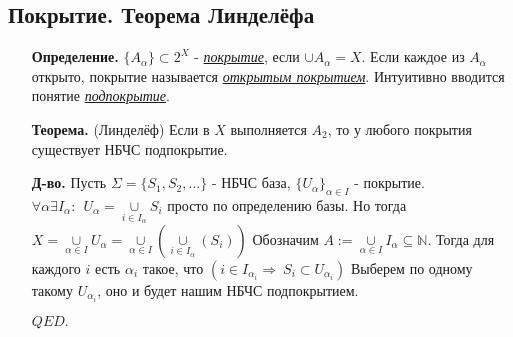 \documentclass[10pt]{report}
\begin{document}
\begin{spacing}{1.5}
\subsection{Покрытие. Теорема Линделёфа}
\begin{enumerate}
\item[\textbf{Определение.}] $\lbrace A_{\alpha}\rbrace\subset 2^{X}$ - \emph{\underline{покрытие}}, если $\cup A_{\alpha}=X$. Если каждое из $A_{\alpha}$ открыто, покрытие называется \emph{\underline{открытым покрытием}}. Интуитивно вводится понятие \emph{\underline{подпокрытие}}.
\item[\textbf{Теорема.}](Линделёф) Если в $X$ выполняется $A_{2}$, то у любого покрытия существует НБЧС подпокрытие.
\item[\textbf{Д-во.}] Пусть $\Sigma=\lbrace S_{1}, S_{2},...\rbrace$ - НБЧС база, $\lbrace U_{\alpha}\rbrace_{\alpha\in I}$ - покрытие.\\
$\forall \alpha \exists I_{\alpha}:~~U_{\alpha} = \underset{i\in I_{\alpha}}{\cup}S_{i}$ просто по определению базы. Но тогда\\
$X = \underset{\alpha\in I}{\cup}U_{\alpha} = \underset{\alpha\in I}{\cup}(\underset{i\in I_{\alpha}}{\cup}(S_{i}))$
Обозначим $A:=\underset{\alpha\in I}{\cup}I_{\alpha}\subseteq \mathbb{N}.$ Тогда для каждого $i$ есть $\alpha_{i}$ такое, что $(i\in I_{\alpha_{i}}\Longrightarrow~S_{i}\subset U_{\alpha_{i}})$ Выберем по одному такому $U_{\alpha_{i}}$, оно и будет нашим НБЧС подпокрытием.
\begin{flushright}
$QED.$
\end{flushright}
\end{enumerate}

\end{spacing}
\end{document}
